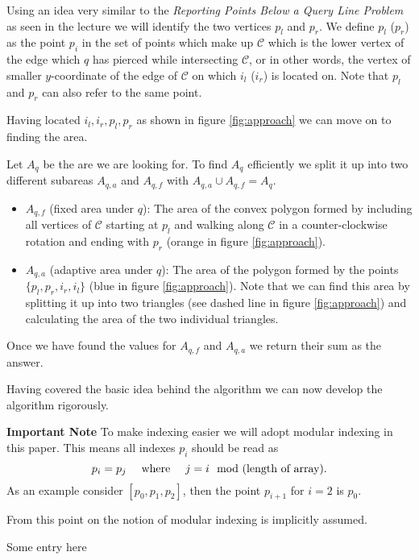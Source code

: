 \documentclass[12pt]{article}
\theoremstyle{definition}
\theoremstyle{remark}
\newcommand{\C}{\mathcal{C}}
\begin{document}
Using an idea very similar to the \textit{Reporting Points Below a Query Line Problem} as seen in the lecture we will identify the two vertices $p_l$ and $p_r$. We define $p_l$ ($p_r$) as the point $p_i$ in the set of points which make up $\C$ which is the lower vertex of the edge which $q$ has pierced while intersecting $\C$, or in other words, the vertex of smaller $y$-coordinate of the edge of $\C$ on which $i_l$ ($i_r$) is located on. Note that $p_l$ and $p_r$ can also refer to the same point.

Having located $i_l, i_r, p_l, p_r$ as shown in figure \ref{fig:approach} we can move on to finding the area.



Let $A_q$ be the are we are looking for. To find $A_q$ efficiently we split it up into two different subareas $A_{q,a}$ and $A_{q,f}$ with $A_{q,a}\cup A_{q,f} = A_{q}$.

\begin{itemize}
	\item $A_{q,f}$ (fixed area under $q$): The area of the convex polygon formed by including all vertices of $\C$ starting at $p_l$ and walking along $\C$ in a counter-clockwise rotation and ending with $p_r$ (orange in figure \ref{fig:approach}).
	\item $A_{q,a}$ (adaptive area under $q$): The area of the polygon formed by the points $\{p_l,p_r,i_r,i_l\}$ (blue in figure \ref{fig:approach}). Note that we can find this area by splitting it up into two triangles (see dashed line in figure \ref{fig:approach}) and calculating the area of the two individual triangles.
\end{itemize}


Once we have found the values for $A_{q,f}$ and $A_{q,a}$ we return their sum as the answer. 


Having covered the basic idea behind the algorithm we can now develop the algorithm rigorously.

\bigskip


\begin{mdframed}
	\textbf{Important Note \quad} To make indexing easier we will adopt modular indexing in this paper. This means all indexes $p_i$ should be read as $$p_i = p_{ j} \text{ \quad where \quad } j=i\mod (\text{length of array}).$$ As an example consider $[p_0,p_1,p_2]$, then the point $p_{i+1}$ for $i=2$ is $p_0$.
	
	From this point on the notion of modular indexing is implicitly assumed.
\end{mdframed}





\begin{thebibliography}{9}
 	Some entry here
	
\end{thebibliography}
\end{document}
